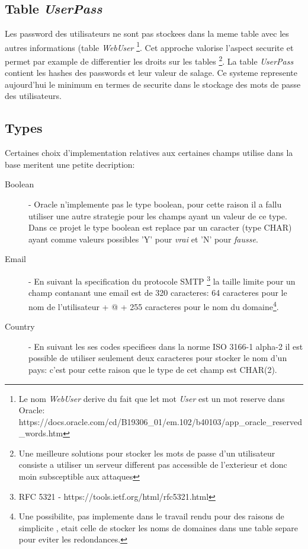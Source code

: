 \documentclass[twoside,openright,a4paper,11pt,french]{article}
\begin{document}
\subsection{Table {\it UserPass}}

Les password des utilisateurs ne sont pas stockees dans la meme table avec les
autres informations (table {\it WebUser}
\footnote{Le nom {\it WebUser} derive du fait que let mot {\it User} est un mot reserve dans Oracle:
https://docs.oracle.com/cd/B19306\_01/em.102/b40103/app\_oracle\_reserved\_words.htm}.
Cet approche valorise l'aspect securite et permet par
example de differentier les droits sur les tables
\footnote{Une meilleure solutions pour stocker les mots de passe d'un
utilisateur consiste a utiliser un serveur different pas accessible de
l'exterieur et donc  moin subsceptible aux attaques}.
La table {\it UserPass} contient les hashes des passwords et leur valeur de
salage.  Ce systeme represente aujourd'hui le minimum en termes de securite
dans le stockage des mots de passe des utilisateurs.


\subsection{Types}
Certaines choix d'implementation relatives aux certaines champs utilise dans la
base meritent une petite decription:


\begin{description}
\item[Boolean] - Oracle n'implemente pas le type boolean, pour cette raison il a
fallu utiliser une autre strategie pour les champs ayant un valeur de ce type.
Dans ce projet le type boolean est replace par un caracter (type CHAR) ayant
comme valeurs possibles 'Y' pour {\it vrai} et 'N' pour {\it fausse}.

\item[Email] - En suivant la specification du protocole SMTP
\footnote{RFC 5321 - https://tools.ietf.org/html/rfc5321.html}
la taille limite pour un champ contanant une email est de 320 caracteres: 64
caracteres pour le nom de l'utilisateur + @ + 255 caracteres pour le nom du
domaine\footnote{Une possibilite, pas implemente dans le travail rendu pour des
raisons de simplicite , etait celle de stocker les noms de domaines dans une
table separe pour eviter les redondances.}.

\item[Country] - En suivant les ses codes specifiees dans la norme ISO 3166-1
alpha-2 il est possible de utiliser seulement deux caracteres pour stocker le
nom d'un pays: c'est pour cette raison que le type de cet champ est CHAR(2).

\end{description}
\end{document}
